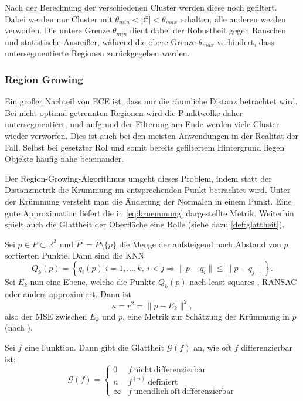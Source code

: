 Nach der Berechnung der verschiedenen Cluster werden diese noch gefiltert.
Dabei werden nur Cluster mit $\theta_{min} < |\mathcal{C}| < \theta_{max}$ erhalten, alle anderen werden verworfen.
Die untere Grenze $\theta_{min}$ dient dabei der Robustheit gegen Rauschen und statistische Ausreißer, während die obere Grenze $\theta_{max}$ verhindert, dass untersegmentierte Regionen zurückgegeben werden.

\subsubsection{Region Growing}
\label{subsubsec:region-growing}

Ein großer Nachteil von \ac{ECE} ist, dass nur die räumliche Distanz betrachtet wird.
Bei nicht optimal getrennten Regionen wird die Punktwolke daher untersegmentiert, und aufgrund der Filterung am Ende werden viele Cluster wieder verworfen.
Dies ist auch bei den meisten Anwendungen in der Realität der Fall.
Selbst bei gesetzter \ac{RoI} und somit bereits gefiltertem Hintergrund liegen Objekte häufig nahe beieinander.

Der Region-Growing-Algorithmus umgeht dieses Problem, indem statt der Distanzmetrik die Krümmung im entsprechenden Punkt betrachtet wird.
Unter der Krümmung versteht man die Änderung der Normalen in einem Punkt.
Eine gute Approximation liefert die in \autoref{eq:kruemmung} dargestellte Metrik.
Weiterhin spielt auch die Glattheit der Oberfläche eine Rolle (siehe dazu \autoref{def:glattheit}).

\begin{definition}
Sei $p \in P \subset \mathbb{R}^3$ und $P' = P \setminus \{p\}$ die Menge der aufsteigend nach Abstand von $p$ sortierten Punkte.
Dann sind die \acl{KNN}
$$
Q_k(p) = \left\{ q_i(p) | i = 1, \dots, k,\ i < j \Rightarrow \|p - q_i\| \leq \|p - q_j\| \right\}.
$$
Sei $E_k$ nun eine Ebene, welche die Punkte $Q_k(p)$ nach least squares \cite{schomaker1959fit}, RANSAC \cite{fischler1981random} oder anders approximiert.
Dann ist
\begin{equation}
\label{eq:kruemmung}
\kappa = r^2 = \|p - E_k\|^2,
\end{equation}
also der \ac{MSE} zwischen $E_k$ und $p$, eine Metrik zur Schätzung der Krümmung in $p$ (nach \cite[Abs. 2.1.2]{rabbani2006segmentation}).
\end{definition}

\begin{definition}
\label{def:glattheit}
Sei $f$ eine Funktion.
Dann gibt die Glattheit $\mathcal{G}(f)$ an, wie oft $f$ differenzierbar ist:
\begin{equation}
\mathcal{G}(f) = \left\{\begin{array}{ll}
0 & f\ \mathrm{nicht\ differenzierbar}\\
n & f^{(n)}\ \mathrm{definiert}\\
\infty & f\ \mathrm{unendlich\ oft\ differenzierbar}
\end{array}\right.
\end{equation}
\end{definition}

